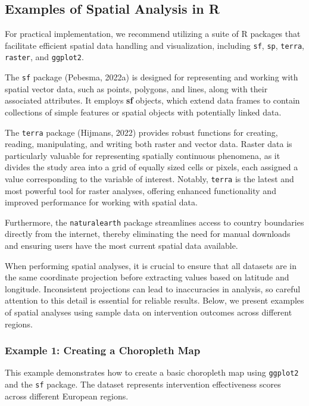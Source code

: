 \documentclass[
]{book}
\begin{document}
\subsection{Examples of Spatial Analysis in R}\label{examples-of-spatial-analysis-in-r}

For practical implementation, we recommend utilizing a suite of R packages that facilitate efficient spatial data handling and visualization, including \texttt{sf}, \texttt{sp}, \texttt{terra}, \texttt{raster}, and \texttt{ggplot2}.

The \texttt{sf} package (Pebesma, 2022a) is designed for representing and working with spatial vector data, such as points, polygons, and lines, along with their associated attributes.
It employs \textbf{sf} objects, which extend data frames to contain collections of simple features or spatial objects with potentially linked data.

The \texttt{terra} package (Hijmans, 2022) provides robust functions for creating, reading, manipulating, and writing both raster and vector data.
Raster data is particularly valuable for representing spatially continuous phenomena, as it divides the study area into a grid of equally sized cells or pixels, each assigned a value corresponding to the variable of interest.
Notably, \texttt{terra} is the latest and most powerful tool for raster analyses, offering enhanced functionality and improved performance for working with spatial data.

Furthermore, the \texttt{naturalearth} package streamlines access to country boundaries directly from the internet, thereby eliminating the need for manual downloads and ensuring users have the most current spatial data available.

When performing spatial analyses, it is crucial to ensure that all datasets are in the same coordinate projection before extracting values based on latitude and longitude.
Inconsistent projections can lead to inaccuracies in analysis, so careful attention to this detail is essential for reliable results.
Below, we present examples of spatial analyses using sample data on intervention outcomes across different regions.

\subsubsection{Example 1: Creating a Choropleth Map}\label{example-1-creating-a-choropleth-map}

This example demonstrates how to create a basic choropleth map using \texttt{ggplot2} and the \texttt{sf} package.
The dataset represents intervention effectiveness scores across different European regions.
\end{document}
